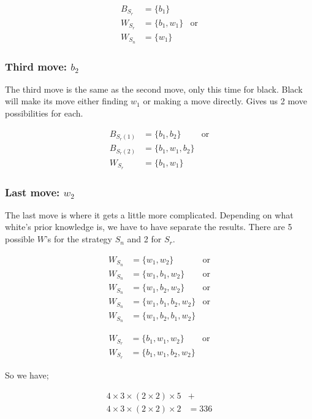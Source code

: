 \begin{align}
	B_{S_r} &= \{b_1\}\nonumber \\
	W_{S_r} &= \{b_1, w_1\} &\text{or}\nonumber \\
	W_{S_n} &= \{w_1\} \nonumber
\end{align}

\subsubsection*{Third move: $b_2$}
The third move is the same as the second move, only this time for black. Black will make its move either finding $w_1$ or making a move directly. Gives us 2 move possibilities for each.

\begin{align}
	B_{S_r(1)} &= \{b_1, b_2\} &\text{or} \nonumber\\
	B_{S_r(2)} &= \{b_1, w_1, b_2\} \nonumber\\
	W_{S_r} &= \{b_1, w_1\} \nonumber
\end{align}

\subsubsection*{Last move: $w_2$}
The last move is where it gets a little more complicated. Depending on what white's prior knowledge is, we have to have separate the results. There are 5 possible $W$'s for the strategy $S_n$ and 2 for $S_r$.

\begin{align}
	W_{S_n} &= \{w_1, w_2\} &\text{or}\nonumber\\
	W_{S_n} &= \{w_1, b_1, w_2\} &\text{or}\nonumber\\
	W_{S_n} &= \{w_1, b_2, w_2\} &\text{or}\nonumber\\
	W_{S_n} &= \{w_1, b_1, b_2, w_2\} &\text{or}\nonumber\\
	W_{S_n} &= \{w_1, b_2, b_1, w_2\} \nonumber
\end{align}

\begin{align}
	W_{S_r} &= \{b_1, w_1, w_2\}&\text{or}\nonumber\\
	W_{S_r} &= \{b_1, w_1, b_2, w_2\} \nonumber
\end{align}

So we have; 

\begin{align}
	4\times3\times(2\times2)\times5 &+ \nonumber\\ 4\times3\times(2\times2)\times2 &= 336 \nonumber
\end{align}

